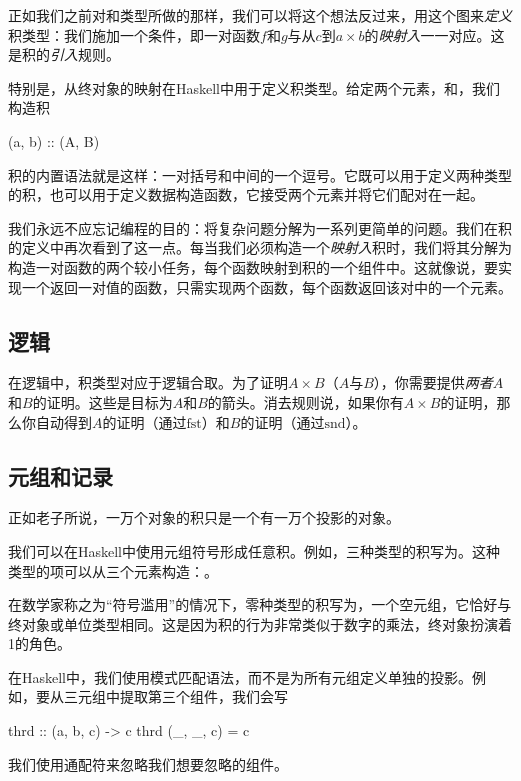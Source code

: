 \documentclass[DaoFP]{subfiles}
\begin{document}
正如我们之前对和类型所做的那样，我们可以将这个想法反过来，用这个图来\emph{定义}积类型：我们施加一个条件，即一对函数$f$和$g$与从$c$到$a \times b$的\emph{映射入}一一对应。这是积的\emph{引入}规则。

特别是，从终对象的映射在Haskell中用于定义积类型。给定两个元素，和，我们构造积

\begin{haskell}
(a, b) :: (A, B)
\end{haskell}
积的内置语法就是这样：一对括号和中间的一个逗号。它既可以用于定义两种类型的积，也可以用于定义数据构造函数，它接受两个元素并将它们配对在一起。

我们永远不应忘记编程的目的：将复杂问题分解为一系列更简单的问题。我们在积的定义中再次看到了这一点。每当我们必须构造一个\emph{映射入}积时，我们将其分解为构造一对函数的两个较小任务，每个函数映射到积的一个组件中。这就像说，要实现一个返回一对值的函数，只需实现两个函数，每个函数返回该对中的一个元素。

\subsection{逻辑}

在逻辑中，积类型对应于逻辑合取。为了证明$A \times B$（$A$与$B$），你需要提供\emph{两者}$A$和$B$的证明。这些是目标为$A$和$B$的箭头。消去规则说，如果你有$A \times B$的证明，那么你自动得到$A$的证明（通过$\text{fst}$）和$B$的证明（通过$\text{snd}$）。

\subsection{元组和记录}

正如老子所说，一万个对象的积只是一个有一万个投影的对象。

我们可以在Haskell中使用元组符号形成任意积。例如，三种类型的积写为。这种类型的项可以从三个元素构造：。

在数学家称之为“符号滥用”的情况下，零种类型的积写为\hask{()}，一个空元组，它恰好与终对象或单位类型相同。这是因为积的行为非常类似于数字的乘法，终对象扮演着1的角色。

在Haskell中，我们使用模式匹配语法，而不是为所有元组定义单独的投影。例如，要从三元组中提取第三个组件，我们会写

\begin{haskell}
thrd :: (a, b, c) -> c
thrd (_, _, c) = c
\end{haskell}
我们使用通配符来忽略我们想要忽略的组件。
\end{document}
